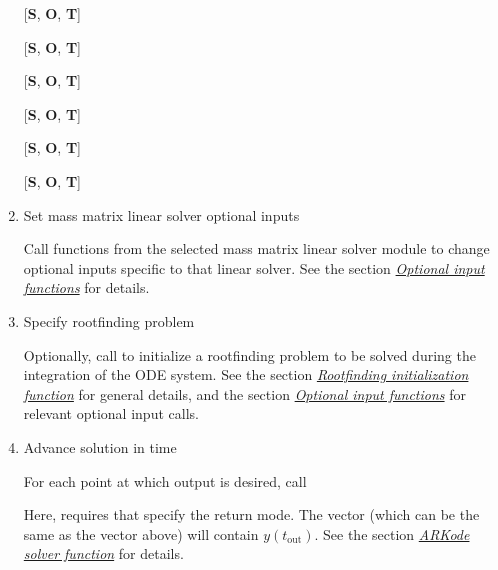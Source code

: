 \documentclass[letterpaper,10pt,english]{sphinxmanual}
\begin{document}
\begin{enumerate}
{[}\textbf{S}, \textbf{O}, \textbf{T}{]} 

{[}\textbf{S}, \textbf{O}, \textbf{T}{]} 

{[}\textbf{S}, \textbf{O}, \textbf{T}{]} 

{[}\textbf{S}, \textbf{O}, \textbf{T}{]} 

{[}\textbf{S}, \textbf{O}, \textbf{T}{]} 

{[}\textbf{S}, \textbf{O}, \textbf{T}{]} 






\item {} 
Set mass matrix linear solver optional inputs

Call  functions from the selected mass matrix linear
solver module to change optional inputs specific to that linear
solver. See the section {\hyperref[c_interface/User_callable:cinterface-optionalinputs]{\emph{Optional input functions}}} for details.

\item {} 
Specify rootfinding problem

Optionally, call {\hyperref[c_interface/User_callable:ARKodeRootInit]{}} to initialize a rootfinding
problem to be solved during the integration of the ODE system. See
the section {\hyperref[c_interface/User_callable:cinterface-rootfinding]{\emph{Rootfinding initialization function}}} for general details, and
the section {\hyperref[c_interface/User_callable:cinterface-optionalinputs]{\emph{Optional input functions}}} for relevant optional
input calls.

\item {} 
Advance solution in time

For each point at which output is desired, call


Here, {\hyperref[c_interface/User_callable:ARKode]{}} requires that 
specify the return mode. The vector  (which can be the same as
the vector  above) will contain $y(t_\text{out})$. See the section
{\hyperref[c_interface/User_callable:cinterface-integration]{\emph{ARKode solver function}}} for details.


\end{enumerate}
\end{document}
